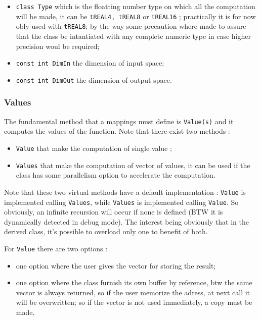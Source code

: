 \begin{itemize}
    \item {\tt class Type} which is the floatting number type on which all the computation will be made,
          it can be {\tt tREAL4, tREAL8} or {\tt tREAL16} ;  practically it is for now obly used
          with {\tt tREAL8}; by the way some precaution where made to assure that
          the class be intantiated with any complete numeric type in case higher precision woul be required;


    \item {\tt const int DimIn} the dimension of input space;

    \item {\tt const int DimOut} the dimension of output space.
\end{itemize}

\subsubsection{Values}

The fundamental method that a  mappings must define is  {\tt Value(s)} and it computes the values of 
the function.  Note that there exist two methods :

\begin{itemize}
     \item {\tt Value} that make the computation of single value ;

     \item {\tt Values} that make the computation of vector of values, it can  be used
           if the class has some parallelism option to accelerate the computation.
\end{itemize}

Note that these two virtual methods  have a default implementation : {\tt Value}
is implemented calling {\tt Values},  while {\tt Values} is implemented calling
{\tt Value}.  So obviously, an infinite recursion will occur if none is defined
(BTW it is dynamically detected in debug mode).  The interest being obviously that
in the derived class, it's possible to overload only one to benefit of both.

For {\tt Value} there are two options : 

\begin{itemize}
     \item  one option where the user gives the vector for storing the result;

     \item  one option where the class furnish its own buffer by reference,
            btw the same vector is always returned, so if the user memorize
            the adress, at next call it will be overwritten; so if the vector
            is not used immediately, a copy must be made.
\end{itemize}



